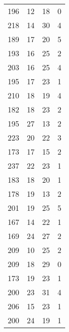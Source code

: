 \documentclass{article}
\begin{document}
\begin{center}
\begin{longtable}{|c|c|c|c|}
196 & 12 & 18 & 0 \\
218 & 14 & 30 & 4 \\
189 & 17 & 20 & 5 \\
193 & 16 & 25 & 2 \\
203 & 16 & 25 & 4 \\
195 & 17 & 23 & 1 \\
210 & 18 & 19 & 4 \\
182 & 18 & 23 & 2 \\
195 & 27 & 13 & 2 \\
223 & 20 & 22 & 3 \\
173 & 17 & 15 & 2 \\
237 & 22 & 23 & 1 \\
183 & 18 & 20 & 1 \\
178 & 19 & 13 & 2 \\
201 & 19 & 25 & 5 \\
167 & 14 & 22 & 1 \\
169 & 24 & 27 & 2 \\
209 & 10 & 25 & 2 \\
209 & 18 & 29 & 0 \\
173 & 19 & 23 & 1 \\
200 & 23 & 31 & 4 \\
206 & 15 & 23 & 1 \\
200 & 24 & 19 & 1 \\
\end{longtable}
\end{center}
\end{document}
